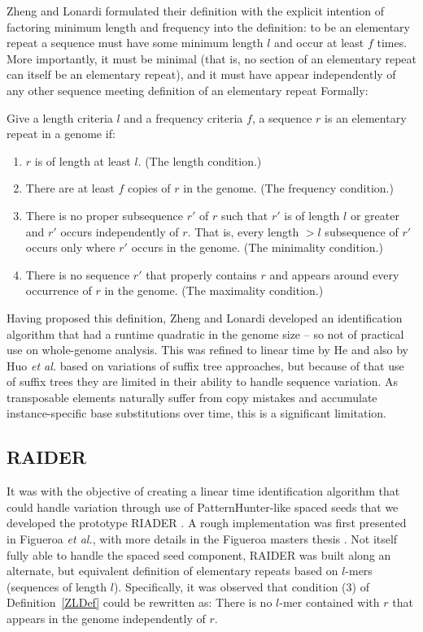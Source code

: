 \documentclass{bmcart}
\begin{document}
Zheng and Lonardi formulated their definition with the explicit
intention of factoring minimum length and 
frequency into the definition: to be an elementary repeat a sequence
must have some minimum length $l$ and occur at least $f$ times.  More
importantly, it must be minimal (that is, no section of an elementary
repeat can itself be an elementary repeat), and it must have appear
independently of any other sequence meeting definition of an
elementary repeat  Formally:
\begin{definition}
Give a length criteria $l$ and a frequency criteria $f$, a sequence
$r$ is an elementary repeat in a genome if:
\begin{enumerate}
\label{ZLDef}
\item $r$ is of length at least $l$.  (The length condition.)
\item There are at least $f$ copies of $r$ in the genome.  (The
  frequency condition.)
\item There is no proper subsequence $r'$ of $r$ such that $r'$ is of
  length $l$ or greater and $r'$ occurs independently of $r$.  That
  is, every length $>l$ subsequence of $r'$ occurs only where $r'$
  occurs in the genome.  (The minimality condition.)
\item There is no sequence $r'$ that properly contains $r$ and appears
  around every occurrence of $r$ in the genome.  (The maximality condition.)
\end{enumerate}
\end{definition}
Having proposed this definition, Zheng and Lonardi developed an
identification algorithm that had a runtime quadratic in the genome
size -- so not of practical use on whole-genome analysis.  This was
refined to linear time by He and also by Huo {\it et al.}
\cite{He:2006gpa,Huo:2009hoa} based on variations of suffix tree
approaches, but because of that use of suffix trees they are limited
in their ability to handle sequence variation.  As transposable
elements naturally suffer from copy mistakes and accumulate
instance-specific base substitutions over time, this is a significant
limitation.

\subsection*{RAIDER}
\label{RAIDERSec}
It was with the objective of creating a linear time identification
algorithm that could handle variation through use of
PatternHunter-like spaced seeds that we developed the prototype RIADER
\cite{Li:2004wl}.  A rough implementation was first presented in
Figueroa {\it et al.}, with more details in the Figueroa masters
thesis \cite{Figueroa:2014uk,Figueroa:2013cz}.  Not itself fully able
to handle the spaced seed component, RAIDER was built along an
alternate, but equivalent definition of elementary repeats based on
$l$-mers (sequences of length $l$).  Specifically, it was observed
that condition (3) of Definition~\ref{ZLDef} could be rewritten as:
There is no $l$-mer contained with $r$ that appears in the genome
independently of $r$.
\end{document}
